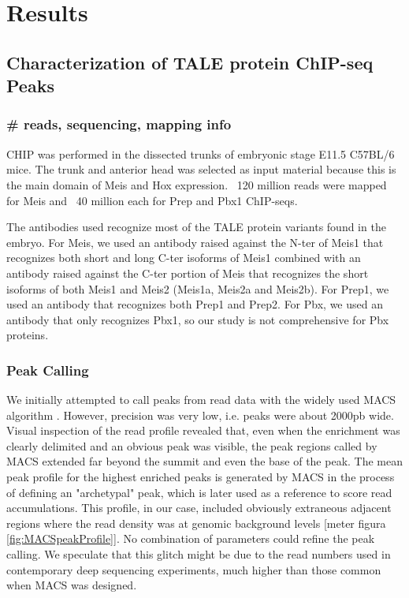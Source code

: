 \chapter{Results}
\label{chp:results}

\section{Characterization of TALE protein ChIP-seq Peaks}

\subsection{\# reads, sequencing, mapping info}

\ac{CHIP} was performed in the dissected trunks of embryonic stage E11.5 C57BL/6 mice. The trunk and anterior head was selected as input material because this is the main domain of Meis and Hox expression. ~120 million reads were mapped for Meis and ~40 million each for Prep and Pbx1 ChIP-seqs.

The antibodies used recognize most of the \ac{TALE} protein variants found in the embryo. For Meis, we used an antibody raised against the \ac{N-ter} of Meis1 that recognizes both short and long \ac{C-ter} isoforms of Meis1 combined with an antibody raised against the \ac{C-ter} portion of Meis that recognizes the short isoforms of both Meis1 and Meis2 (Meis1a, Meis2a and Meis2b). For Prep1, we used an antibody that recognizes both Prep1 and Prep2. For Pbx, we used an antibody that only recognizes Pbx1, so our study is not comprehensive for Pbx proteins.

\subsection{Peak Calling}

We initially attempted to call peaks from read data with the widely used \ac{MACS} algorithm \parencite{Zhang2008}. However, precision was very low, i.e. peaks were about 2000pb wide. Visual inspection of the read profile revealed that, even when the enrichment was clearly delimited and an obvious peak was visible, the peak regions called by \ac{MACS} extended far beyond the summit and even the base of the peak. The mean peak profile for the highest enriched peaks is generated by \ac{MACS} in the process of defining an "archetypal" peak, which is later used as a reference to score read accumulations. This profile, in our case, included obviously extraneous adjacent regions where the read density was at genomic background levels [meter figura \ref{fig:MACSpeakProfile}]. No combination of parameters could refine the peak calling. We speculate that this glitch might be due to the read numbers used in contemporary deep sequencing experiments, much higher than those common when \ac{MACS} was designed.

